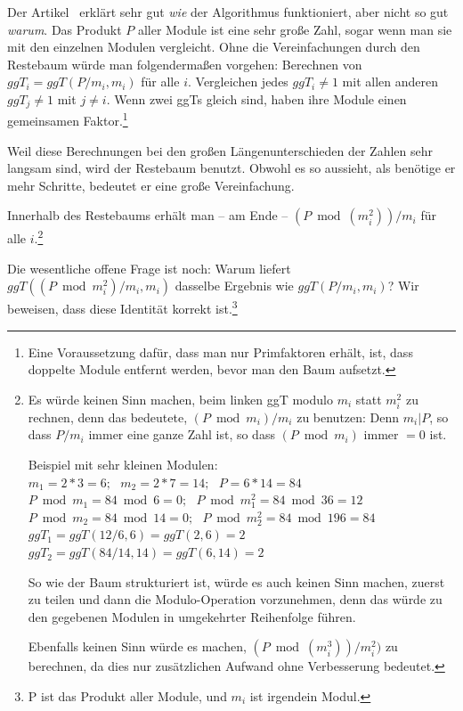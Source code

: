 \begin{refsegment}
Der Artikel~\cite{Heninger2012} erklärt sehr gut \textit{wie} der Algorithmus funktioniert, aber nicht so gut \textit{warum}. Das Produkt $P$ aller Module ist eine sehr große Zahl, sogar wenn man sie mit den einzelnen Modulen vergleicht. Ohne die Vereinfachungen durch den Restebaum würde man folgendermaßen vorgehen: Berechnen von $ggT_{i} = ggT( P / m_{i},  m_{i}) $ für alle $i$. Vergleichen jedes $ggT_{i} \ne 1$ mit allen anderen $ggT_{j} \ne 1$ mit  $j \ne i$. Wenn zwei ggTs gleich sind, haben ihre Module einen gemeinsamen Faktor.\footnote{%
Eine Voraussetzung dafür, dass man nur Primfaktoren erhält, ist, dass doppelte Module entfernt werden, bevor man den Baum aufsetzt.
}

Weil diese Berechnungen bei den großen Längenunterschieden der Zahlen sehr langsam sind, wird der Restebaum benutzt. Obwohl es so aussieht, als benötige er mehr Schritte, bedeutet er eine große Vereinfachung.

Innerhalb des Restebaums erhält man -- am Ende -- $(P \bmod ({m_{i}^{2}}) ) / m_{i}$ für alle $i$.\footnote{%
Es würde keinen Sinn machen, beim linken ggT modulo $m_{i}$ statt $m_{i}^{2}$
zu rechnen, denn das bedeutete, $(P \bmod m_{i} ) / m_{i}$ zu benutzen: Denn
$m_{i} | P$, so dass $P/m_{i}$ immer eine ganze Zahl ist, so dass
$(P \bmod m_{i} )$ immer $= 0$ ist.

 Beispiel mit sehr kleinen Modulen:\\
$ m_{1} = 2*3 = 6;~~~ m_{2} = 2*7 = 14;~~~ P=6*14=84 $\\
$ P \bmod m_{1} = 84 \bmod 6 = 0;~~~ P \bmod {m_{1}^{2}} = 84 \bmod 36 = 12 $\\
$ P \bmod m_{2} = 84 \bmod 14 = 0;~~~ P \bmod {m_{2}^{2}} = 84 \bmod 196 = 84 $\\
$ggT_{1} = ggT(12/6, 6) = ggT(2, 6) = 2 $\\
$ggT_{2} = ggT(84/14, 14) = ggT(6, 14) = 2 $

So wie der Baum strukturiert ist, würde es auch keinen Sinn machen, zuerst zu
teilen und dann die Modulo-Operation vorzunehmen, denn das würde zu den gegebenen Modulen in umgekehrter Reihenfolge führen.

Ebenfalls keinen Sinn würde es machen, $(P \bmod ({m_{i}^{3}}) ) / {m_{i}^{2}})$ zu berechnen, da dies nur zusätzlichen Aufwand ohne Verbesserung bedeutet.
}

Die wesentliche offene Frage ist noch: Warum liefert $ggT((P \bmod {m_{i}^{2}})/ m_{i}, m_{i})$ dasselbe Ergebnis wie $ggT( P / m_{i}, m_{i})$?
Wir beweisen, dass diese Identität korrekt ist.\footnote{%
P ist das Produkt aller Module, und $m_{i}$ ist irgendein Modul.
}


\end{refsegment}
